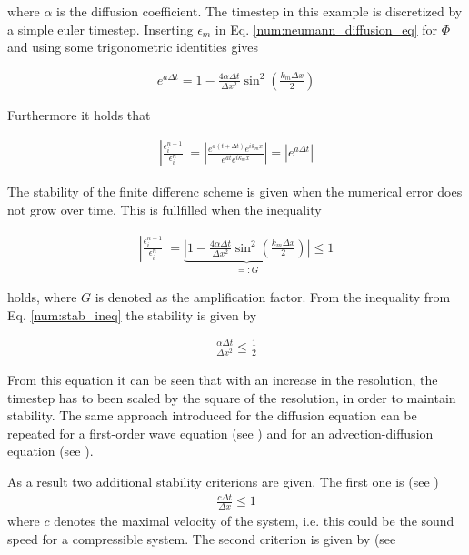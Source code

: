 where $\alpha$ is the diffusion coefficient. The timestep in this example is discretized by a simple euler timestep.
Inserting $\epsilon_m$ in Eq. \ref{num:neumann_diffusion_eq} for $\Phi$ and using some trigonometric identities  gives

\begin{align}
    e^{a \Delta t} = 1 -  \frac{4\alpha \Delta t}{\Delta x^2} \sin^2\left(\frac{k_m \Delta x}{2}\right)
\end{align}

Furthermore it holds that

\begin{align}
    \left|\frac{\epsilon_i^{n+1}}{\epsilon_i^n}\right| =
    \left|\frac{e^{a(t + \Delta t)}e^{ik_mx}}{ e^{at}e^{ik_m x}}\right| = \left|e^{a\Delta t}\right|
\end{align}

The stability of the finite differenc scheme is given when the numerical error does not grow over time. This is fullfilled when the inequality

\begin{align}
    \label{num:stab_ineq}
    \left|\frac{\epsilon_i^{n+1}}{\epsilon_i^n}\right| =
    \underbrace{\left|1 -  \frac{4\alpha \Delta t}{\Delta x^2} \sin^2\left(\frac{k_m \Delta x}{2}\right)\right|}_{=:G} \leq 1
\end{align}

holds, where $G$ is denoted as the amplification factor. From the inequality from Eq. \ref{num:stab_ineq}
the stability is given by

\begin{align}
   \frac{\alpha \Delta t}{\Delta x^2} \leq \frac{1}{2}
\end{align}

From this equation it can be seen that with an increase in the resolution, the timestep has to been scaled by the square of the resolution, in order to
maintain stability. The same approach introduced for the diffusion equation can be repeated for a first-order wave equation (see \citep{janderson})
and for an advection-diffusion equation (see \citep{ferziger99}).

As a result two additional stability criterions are given.
The first one is (see \citep{janderson})
\begin{align}
    \label{num:stab_soundspeed}
   \frac{c \Delta t}{\Delta x} \leq 1
\end{align}
where $c$ denotes the maximal velocity of the system, i.e. this could be the sound speed for a compressible system.
The second criterion is given by (see \citep{ferziger99}

